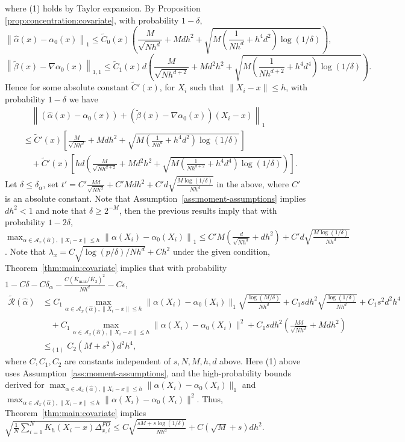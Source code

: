\documentclass[11pt]{article}
\newcommand{\norm}[1]{\left\lVert #1 \right\rVert}
\begin{document}
where (1) holds by Taylor expansion. By Proposition \ref{prop:concentration:covariate}, with probability $1-\delta$, 
$$\norm{\hat{\alpha}(x)-\alpha_0(x)}_1\leq\tilde{C}_0(x)\left(\frac{M}{\sqrt{Nh^d}}+Mdh^2+\sqrt{M\left(\frac{1}{Nh^d}+h^4d^2\right)\log(1/\delta)}\right),$$ $$\norm{\tilde{\beta}(x)-\nabla\alpha_0(x)}_{1,1}\leq\tilde{C}_1(x)d\left(\frac{M}{\sqrt{Nh^{d+2}}}+Md^2h^2+\sqrt{M\left(\frac{1}{Nh^{d+2}}+h^4d^4\right)\log(1/\delta)}\right).$$
Hence for some absolute constant $\tilde{C}'(x)$, for $X_i$ such that $\|X_i-x\|\leq h$, with probability $1-\delta$ we have 
$$\begin{array}{rl}
&\displaystyle\quad\norm{(\hat{\alpha}(x)-\alpha_0(x))+(\tilde{\beta}(x)-\nabla\alpha_0(x))(X_i-x)}_1\\
&\displaystyle\leq\tilde{C}'(x)\left[\frac{M}{\sqrt{Nh^d}}+Mdh^2+\sqrt{M\left(\frac{1}{Nh^d}+h^4d^2\right)\log(1/\delta)}\right]\\
&\displaystyle\quad+\tilde{C}'(x)\left[hd\left(\frac{M}{\sqrt{Nh^{d+2}}}+Md^2h^2+\sqrt{M\left(\frac{1}{Nh^{d+2}}+h^4d^4\right)\log(1/\delta)}\right)\right].
\end{array}$$
Let $\delta\leq\delta_{\alpha}$, set $t'=C'\frac{Md}{\sqrt{Nh^d}}+C'Mdh^2+C'd\sqrt{\frac{M\log(1/\delta)}{Nh^d}}$ in the above, where $C'$ is an absolute constant. Note that Assumption~\ref{ass:moment-assumptions} implies $dh^2<1$ and note that $\delta\geq2^{-M}$, then the previous results imply that with probability $1-2\delta$, $\max_{\alpha \in \mathcal{A}_x(\hat\alpha), \|X_i-x\|\leq h}\norm{\alpha(X_i)-\alpha_0(X_i)}_1\leq C'M\left(\frac{d}{\sqrt{Nh^d}}+dh^2\right)+C'd\sqrt{\frac{M\log(1/\delta)}{Nh^d}}$. Note that $\lambda_x=C\sqrt{\log(p/\delta)/Nh^d}+Ch^2$ under the given condition, Theorem~\ref{thm:main:covariate} implies that with probability $1-C\delta-C\delta_\alpha-\frac{C(\bar{K}_{\max}/\bar{K}_2)^2}{Nh^d}-C\epsilon$,
$$\begin{array}{rl}
\widetilde{\mathcal{R}}(\hat\alpha) &\displaystyle\leq C_1\max_{\alpha \in \mathcal{A}_x(\hat\alpha), \|X_i-x\|\leq h}\|\alpha(X_i)-\alpha_0(X_i)\|_1 \sqrt{\frac{\log(M/\delta)}{Nh^d}}+C_1sdh^2\sqrt{\frac{\log(1/\delta)}{Nh^d}}+C_1s^2d^2h^4\\
&\displaystyle\quad + C_1\max_{\alpha \in \mathcal{A}_x(\hat\alpha), \|X_i-x\|\leq h} \|\alpha(X_i)-\alpha_0(X_i)\|^2+C_1sdh^2\left(\frac{Md}{\sqrt{Nh^{d}}}+Mdh^2\right)\\
&\displaystyle\leq_{(1)}C_2(M+s^2)d^2h^4,
\end{array}$$
where $C,C_1,C_2$ are constants independent of $s,N,M,h,d$ above. Here (1) above uses Assumption~\ref{ass:moment-assumptions}, and the high-probability bounds derived for ${\displaystyle\max_{\alpha \in \mathcal{A}_x(\hat\alpha), \|X_i-x\|\leq h}}\|\alpha(X_i)-\alpha_0(X_i)\|_1$ and ${\displaystyle\max_{\alpha \in \mathcal{A}_x(\hat\alpha), \|X_i-x\|\leq h}} \|\alpha(X_i)-\alpha_0(X_i)\|^2$. Thus, Theorem~\ref{thm:main:covariate} implies $\sqrt{\frac{1}{N}\sum_{i=1}^N K_h(X_i-x)\Delta_{x,i}^{FO}}\leq C\sqrt{\frac{sM+s\log(1/\delta)}{Nh^d}}+C(\sqrt{M}+s)dh^2$. 
\end{document}
